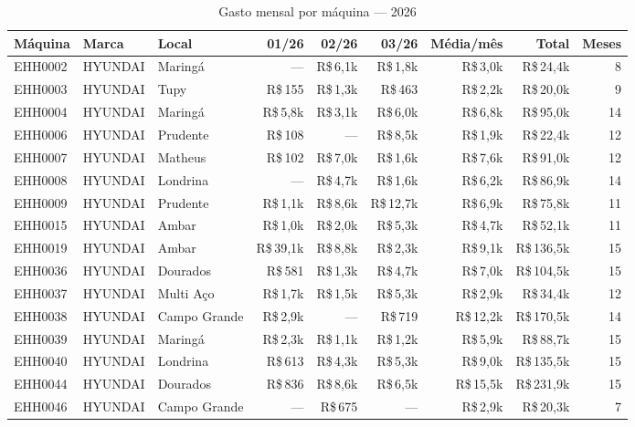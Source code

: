 \begin{table}[H]
\centering
\footnotesize
\setlength{\tabcolsep}{3.5pt}
\renewcommand{\arraystretch}{0.95}
\caption{Gasto mensal por máquina — 2026}
\begin{tabular}{@{}ll>{\raggedright\arraybackslash}p{2.2cm}rrrrrr@{}}
\toprule
Máquina & Marca & Local & 01/26 & 02/26 & 03/26 & Média/mês & Total & Meses \\
\midrule
EHH0002 & HYUNDAI & Maringá & --- & R\$\,6,1k & R\$\,1,8k & R\$\,3,0k & R\$\,24,4k & 8 \\
EHH0003 & HYUNDAI & Tupy & R\$\,155 & R\$\,1,3k & R\$\,463 & R\$\,2,2k & R\$\,20,0k & 9 \\
EHH0004 & HYUNDAI & Maringá & R\$\,5,8k & R\$\,3,1k & R\$\,6,0k & R\$\,6,8k & R\$\,95,0k & 14 \\
EHH0006 & HYUNDAI & Prudente & R\$\,108 & --- & R\$\,8,5k & R\$\,1,9k & R\$\,22,4k & 12 \\
EHH0007 & HYUNDAI & Matheus & R\$\,102 & R\$\,7,0k & R\$\,1,6k & R\$\,7,6k & R\$\,91,0k & 12 \\
EHH0008 & HYUNDAI & Londrina & --- & R\$\,4,7k & R\$\,1,6k & R\$\,6,2k & R\$\,86,9k & 14 \\
EHH0009 & HYUNDAI & Prudente & R\$\,1,1k & R\$\,8,6k & R\$\,12,7k & R\$\,6,9k & R\$\,75,8k & 11 \\
EHH0015 & HYUNDAI & Ambar & R\$\,1,0k & R\$\,2,0k & R\$\,5,3k & R\$\,4,7k & R\$\,52,1k & 11 \\
EHH0019 & HYUNDAI & Ambar & R\$\,39,1k & R\$\,8,8k & R\$\,2,3k & R\$\,9,1k & R\$\,136,5k & 15 \\
EHH0036 & HYUNDAI & Dourados & R\$\,581 & R\$\,1,3k & R\$\,4,7k & R\$\,7,0k & R\$\,104,5k & 15 \\
EHH0037 & HYUNDAI & Multi Aço & R\$\,1,7k & R\$\,1,5k & R\$\,5,3k & R\$\,2,9k & R\$\,34,4k & 12 \\
EHH0038 & HYUNDAI & Campo Grande & R\$\,2,9k & --- & R\$\,719 & R\$\,12,2k & R\$\,170,5k & 14 \\
EHH0039 & HYUNDAI & Maringá & R\$\,2,3k & R\$\,1,1k & R\$\,1,2k & R\$\,5,9k & R\$\,88,7k & 15 \\
EHH0040 & HYUNDAI & Londrina & R\$\,613 & R\$\,4,3k & R\$\,5,3k & R\$\,9,0k & R\$\,135,5k & 15 \\
EHH0044 & HYUNDAI & Dourados & R\$\,836 & R\$\,8,6k & R\$\,6,5k & R\$\,15,5k & R\$\,231,9k & 15 \\
EHH0046 & HYUNDAI & Campo Grande & --- & R\$\,675 & --- & R\$\,2,9k & R\$\,20,3k & 7 \\

\end{tabular}
\end{table}

